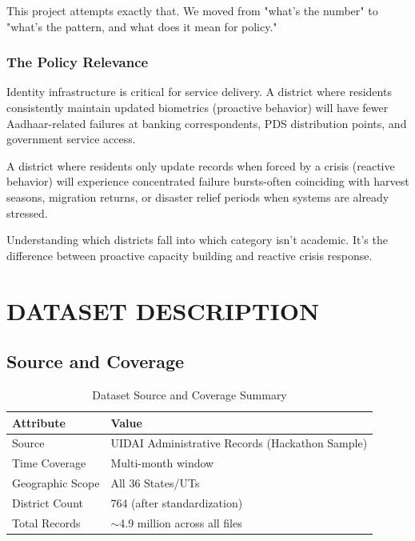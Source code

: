 \documentclass[11pt, a4paper]{article}
\begin{document}
This project attempts exactly that. We moved from "what's the number" to "what's the pattern, and what does it mean for policy."


\subsubsection{The Policy Relevance}

Identity infrastructure is critical for service delivery. A district where residents consistently maintain updated biometrics (proactive behavior) will have fewer Aadhaar-related failures at banking correspondents, PDS distribution points, and government service access.


A district where residents only update records when forced by a crisis (reactive behavior) will experience concentrated failure bursts-often coinciding with harvest seasons, migration returns, or disaster relief periods when systems are already stressed.


Understanding which districts fall into which category isn't academic. It's the difference between proactive capacity building and reactive crisis response.




\section{DATASET DESCRIPTION}

\subsection{Source and Coverage}

\vspace{0.8em}
\begin{table}[H]
\caption{Dataset Source and Coverage Summary}
{\small
\begin{tabularx}{\textwidth}{|Y|Y|}
\hline
\textbf{Attribute} & \textbf{Value} \\ \hline
Source & UIDAI Administrative Records (Hackathon Sample) \\ \hline
Time Coverage & Multi-month window \\ \hline
Geographic Scope & All 36 States/\allowbreak UTs \\ \hline
District Count & 764 (after standardization) \\ \hline
Total Records & $\sim$4.9 million across all files \\ \hline
\end{tabularx}
}
\end{table}
\end{document}

